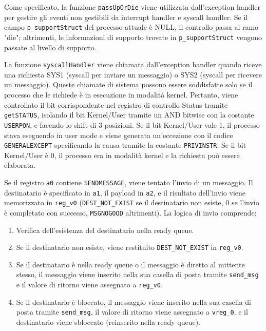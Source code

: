 \documentclass[a4paper]{article}
\begin{document}
Come specificato, la funzione \verb+passUpOrDie+ viene utilizzata dall'exception handler per gestire gli eventi non gestibili da interrupt handler e syscall handler. Se il campo \verb+p_supportStruct+ del processo attuale è NULL, il controllo passa al ramo "die"; altrimenti, le informazioni di supporto trovate in \verb+p_supportStruct+ vengono passate al livello di supporto.

La funzione \verb+syscallHandler+ viene chiamata dall'exception handler quando riceve una richiesta SYS1 (syscall per inviare un messaggio) o SYS2 (syscall per ricevere un messaggio). Queste chiamate di sistema possono essere soddisfatte solo se il processo che le richiede è in esecuzione in modalità kernel. Pertanto, viene controllato il bit corrispondente nel registro di controllo Status tramite \verb+getSTATUS+, isolando il bit Kernel/User tramite un AND bitwise con la costante \verb+USERPON+, e facendo lo shift di 3 posizioni. Se il bit Kernel/User vale 1, il processo stava eseguendo in user mode e viene generata un'eccezione con il codice \verb+GENERALEXCEPT+ specificando la causa tramite la costante \verb+PRIVINSTR+. Se il bit Kernel/User è 0, il processo era in modalità kernel e la richiesta può essere elaborata.

Se il registro \verb+a0+ contiene \verb+SENDMESSAGE+, viene tentato l'invio di un messaggio. Il destinatario è specificato in \verb+a1+, il payload in \verb+a2+, e il risultato dell'invio viene memorizzato in \verb+reg_v0+ (\verb+DEST_NOT_EXIST+ se il destinatario non esiste, 0 se l'invio è completato con successo, \verb+MSGNOGOOD+ altrimenti). La logica di invio comprende:
\begin{enumerate}
\item Verifica dell'esistenza del destinatario nella ready queue.
\item Se il destinatario non esiste, viene restituito \verb+DEST_NOT_EXIST+ in \verb+reg_v0+.
\item Se il destinatario è nella ready queue o il messaggio è diretto al mittente stesso, il messaggio viene inserito nella sua casella di posta tramite \verb+send_msg+ e il valore di ritorno viene assegnato a \verb+reg_v0+.
\item Se il destinatario è bloccato, il messaggio viene inserito nella sua casella di posta tramite \verb+send_msg+, il valore di ritorno viene assegnato a \verb+vreg_0+, e il destinatario viene sbloccato (reinserito nella ready queue).
\end{enumerate}
\end{document}
